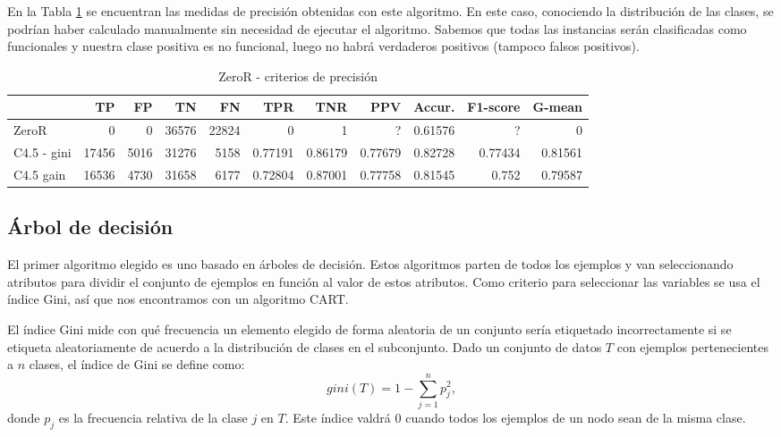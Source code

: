 \documentclass[a4paper, 20pt]{article}
\begin{document}
En la Tabla \ref{tab:zeroR} se encuentran las medidas de precisión obtenidas con este algoritmo. En este caso, conociendo la distribución de las clases, se podrían haber calculado manualmente sin necesidad de ejecutar el algoritmo. Sabemos que todas las instancias serán clasificadas como funcionales y nuestra clase positiva es no funcional, luego no habrá verdaderos positivos (tampoco falsos positivos).

\begin{table}[H]
  \centering
  \caption{ZeroR - criterios de precisión}
  \label{tab:zeroR}
  \begin{tabular}{lrrrrrrrrrr}
    \toprule
    & TP & FP & TN & FN & TPR & TNR & PPV & Accur. & F1-score & G-mean\\ \midrule
    ZeroR & 0 & 0 & 36576 & 22824 & 0 & 1 & ? & 0.61576 & ? & 0\\
C4.5 - gini  & 17456 & 5016 & 31276 & 5158 & 0.77191 & 0.86179 & 0.77679 & 0.82728 & 0.77434 & 0.81561\\
C4.5 gain & 16536 & 4730 & 31658 & 6177 & 0.72804 & 0.87001 & 0.77758 & 0.81545 & 0.752 & 0.79587\\

\bottomrule
  \end{tabular}
\end{table}


\subsection{Árbol de decisión}

El primer algoritmo elegido es uno basado en árboles de decisión. Estos algoritmos parten de todos los ejemplos y van seleccionando atributos para dividir el conjunto de ejemplos en función al valor de estos atributos. Como criterio para seleccionar las variables se usa el índice Gini, así que nos encontramos con un algoritmo CART.

El índice Gini mide con qué frecuencia un elemento elegido de forma aleatoria de un conjunto sería etiquetado incorrectamente si se etiqueta aleatoriamente de acuerdo a la distribución de clases en el subconjunto. Dado un conjunto de datos $T$ con ejemplos pertenecientes a $n$ clases, el índice de Gini se define como:
\[gini(T) = 1 - \sum_{j=1}^np_j^2,\] donde $p_j$ es la frecuencia relativa de la clase $j$ en $T$. Este índice valdrá 0 cuando todos los ejemplos de un nodo sean de la misma clase.
\end{document}
